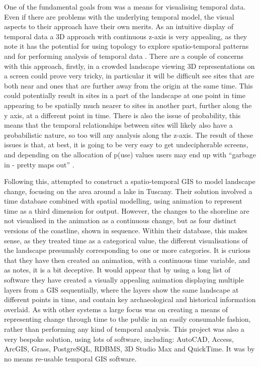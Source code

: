 One of the fundamental goals from \citet{lock2002analysing} was a means for visualising temporal data. Even if there are problems with the underlying temporal model, the visual aspects to their approach have their own merits. As an intuitive display of temporal data a 3D approach with continuous z-axis is very appealing, as they note it has the potential for using topology to explore spatio-temporal patterns and for performing analysis of temporal data \citep[5]{lock2002analysing}. There are a couple of concerns with this approach, firstly, in a crowded landscape viewing 3D representations on a screen could prove very tricky, in particular it will be difficult see sites that are both near and ones that are further away from the origin at the same time. This could potentially result in sites in a part of the landscape at one point in time appearing to be spatially much nearer to sites in another part, further along the y axis, at a different point in time. There is also the issue of probability, this means that the temporal relationships between sites will likely also have a probabilistic nature, so too will any analysis along the z-axis. The result of these issues is that, at best, it is going to be very easy to get undecipherable screens, and depending on the allocation of p(use) values users may end up with ``garbage in - pretty maps out'' \citep[1]{lock2002analysing}.

Following this, \citet{Ceccarelli:2003fk} attempted to construct a spatio-temporal GIS to model landscape change, focusing on the area around a lake in Tuscany. Their solution involved a time database combined with spatial modelling, using animation to represent time as a third dimension for output. However, the changes to the shoreline are not visualised in the animation as a continuous change, but as four distinct  versions of the coastline, shown in sequence. Within their database, this makes sense, as they treated time as a categorical value, the different visualisations of the landscape presumably corresponding to one or more categories. It is curious that they have then created an animation, with a continuous time variable, and as \citet{Green:2008fk} notes, it is a bit deceptive. It would appear that by using a long list of software they have created a visually appealing animation displaying multiple layers from a GIS sequentially, where the layers show the same landscape at different points in time, and contain key archaeological and historical information overlaid. As with other systems a large focus was on creating a means of representing change through time to the public in an easily consumable fashion, rather than performing any kind of temporal analysis. This project was also a very bespoke solution, using lots of software, including: AutoCAD, Access, ArcGIS, Grass, PostgreSQL, RDBMS, 3D Studio Max and QuickTime. It was by no means re-usable temporal GIS software.

